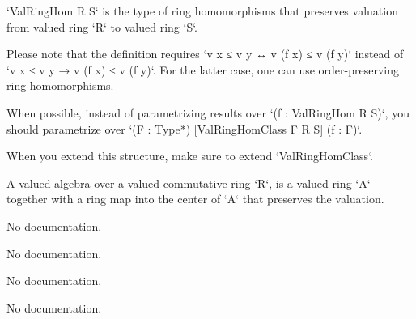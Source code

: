 \begin{definition}\label{ValRingHom}
        \leanok
                `ValRingHom R S` is the type of ring homomorphisms that preserves valuation from valued ring `R` to valued ring `S`.

Please note that the definition requires `v x ≤ v y ↔ v (f x) ≤ v (f y)` instead of `v x ≤ v y → v (f x) ≤ v (f y)`. For the latter case, one can use order-preserving ring homomorphisms.

When possible, instead of parametrizing results over `(f : ValRingHom R S)`,
you should parametrize over `(F : Type*) [ValRingHomClass F R S] (f : F)`.

When you extend this structure, make sure to extend `ValRingHomClass`.
    \end{definition}

\begin{definition}\label{ValAlgebra}
        \leanok
                A valued algebra over a valued commutative ring `R`, is a valued ring `A` together with a ring map into the center of `A` that preserves the valuation.
    \end{definition}

\begin{definition}\label{DiscretelyValued.extensionFiniteDimension}
                No documentation.
    \end{definition}

\begin{theorem}\label{Valuation.isEquiv_of_finiteDimensional}
                No documentation.
    \end{theorem}

\begin{definition}\label{AlgEquiv.toValAlgEquiv}
                No documentation.
    \end{definition}

\begin{definition}\label{DiscreteValuation.ofInt}
        \leanok
                No documentation.
    \end{definition}

